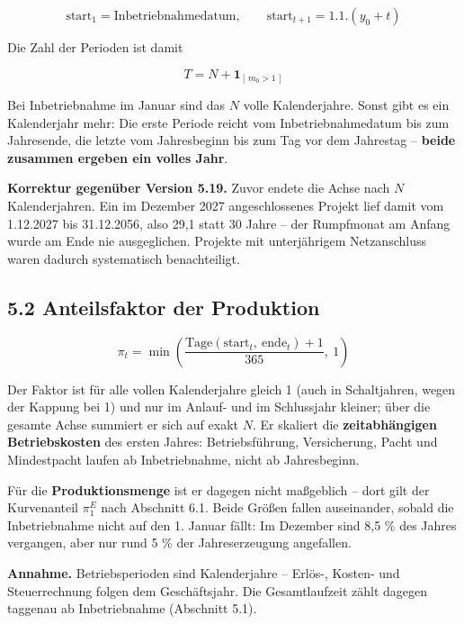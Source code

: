 \documentclass[
  a4paper,
  10pt]{article}
\renewenvironment{quote}
  {\begin{tcolorbox}[
      enhanced,
      breakable,
      colback=Wash,
      colframe=Brand,
      boxrule=0pt,
      leftrule=2.2pt,
      arc=0pt,
      left=8pt,right=8pt,top=6pt,bottom=6pt,
      before skip=8pt,after skip=9pt
    ]\small\color{InkSoft}}
  {\end{tcolorbox}}
\begin{document}
\[ \mathrm{start}_1 = \text{Inbetriebnahmedatum}, \qquad \mathrm{start}_{t+1} = 1.1.(y_0 + t) \]

Die Zahl der Perioden ist damit

\[ T = N + \mathbf{1}_{[\,m_0 > 1\,]} \]

Bei Inbetriebnahme im Januar sind das \(N\) volle Kalenderjahre. Sonst
gibt es ein Kalenderjahr mehr: Die erste Periode reicht vom
Inbetriebnahmedatum bis zum Jahresende, die letzte vom Jahresbeginn bis
zum Tag vor dem Jahrestag -- \textbf{beide zusammen ergeben ein volles
Jahr}.

\begin{quote}
\textbf{Korrektur gegenüber Version 5.19.} Zuvor endete die Achse nach
\(N\) Kalenderjahren. Ein im Dezember 2027 angeschlossenes Projekt lief
damit vom 1.12.2027 bis 31.12.2056, also 29,1 statt 30 Jahre -- der
Rumpfmonat am Anfang wurde am Ende nie ausgeglichen. Projekte mit
unterjährigem Netzanschluss waren dadurch systematisch benachteiligt.
\end{quote}

\hypertarget{anteilsfaktor-der-produktion}{%
\subsection{5.2 Anteilsfaktor der
Produktion}\label{anteilsfaktor-der-produktion}}

\[ \pi_t = \min\left(\frac{\mathrm{Tage}(\mathrm{start}_t,\ \mathrm{ende}_t) + 1}{365},\ 1\right) \]

Der Faktor ist für alle vollen Kalenderjahre gleich 1 (auch in
Schaltjahren, wegen der Kappung bei 1) und nur im Anlauf- und im
Schlussjahr kleiner; über die gesamte Achse summiert er sich auf exakt
\(N\). Er skaliert die \textbf{zeitabhängigen Betriebskosten} des ersten
Jahres: Betriebsführung, Versicherung, Pacht und Mindestpacht laufen ab
Inbetriebnahme, nicht ab Jahresbeginn.

Für die \textbf{Produktionsmenge} ist er dagegen nicht maßgeblich --
dort gilt der Kurvenanteil \(\pi^{E}_1\) nach Abschnitt 6.1. Beide
Größen fallen auseinander, sobald die Inbetriebnahme nicht auf den 1.
Januar fällt: Im Dezember sind 8,5 \% des Jahres vergangen, aber nur
rund 5 \% der Jahreserzeugung angefallen.

\begin{quote}
\textbf{Annahme.} Betriebsperioden sind Kalenderjahre -- Erlös-, Kosten-
und Steuerrechnung folgen dem Geschäftsjahr. Die Gesamtlaufzeit zählt
dagegen taggenau ab Inbetriebnahme (Abschnitt 5.1).
\end{quote}
\end{document}
